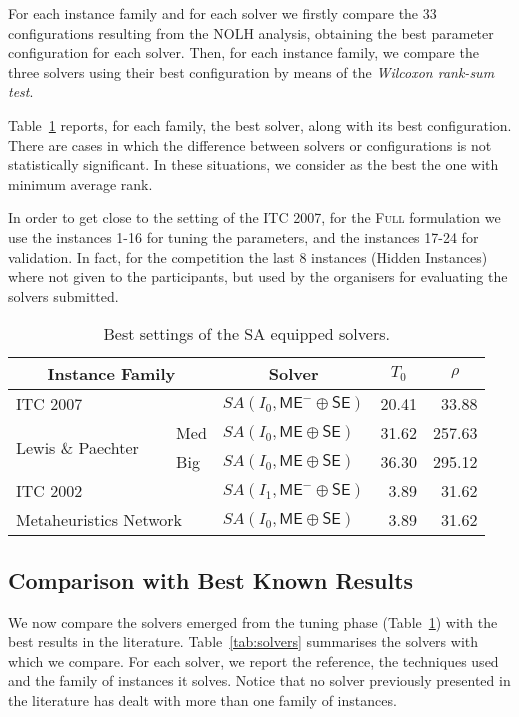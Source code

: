 \documentclass[authoryear,preprint,a4paper,12pt]{elsarticle}
\begin{document}
For each instance family and for each solver we firstly
compare the 33 configurations resulting from the NOLH analysis,
obtaining the best parameter configuration for each solver. Then, for
each instance family, we compare the three solvers using their best
configuration by means of the \emph{Wilcoxon rank-sum test}. 

Table~\ref{tab:comp_solvers} reports, for each family, the best
solver, along with its best configuration. There are cases in which
the difference between solvers or configurations is not statistically
significant. In these situations, we consider as the best the one with
minimum average rank.

In order to get close to the setting of the ITC 2007, for the
\textsc{Full} formulation we use the instances 1-16 for tuning the
parameters, and the instances 17-24 for validation. In fact, for the
competition the last 8 instances (Hidden Instances) where not given to
the participants, but used by the organisers for evaluating the
solvers submitted.

\begin{table}
\centering
\footnotesize
\begin{tabular}{|r@{}l|l|r|r|}\hline
\multicolumn{2}{|c|}{Instance Family} & \multicolumn{1}{c|}{Solver} & \multicolumn{1}{c|}{$T_0$} & \multicolumn{1}{c|}{$\rho$} \\ \hline
\multicolumn{2}{|l|}{ITC 2007} & $SA(I_{0}, \mathsf{ME^-}\oplus\mathsf{SE})$ & 20.41  & 33.88 \\
 \multirow{2}{*}{Lewis \& Paechter}  &~~ Med  & $SA(I_{0}, \mathsf{ME}\oplus\mathsf{SE})$ & 31.62 & 257.63 \\
 						     &~~ Big & $SA(I_{0}, \mathsf{ME}\oplus\mathsf{SE})$ & 36.30 & 295.12 \\
\multicolumn{2}{|l|}{ITC 2002} & $SA(I_{1}, \mathsf{ME^-}\oplus \mathsf{SE})$	 & 3.89 &  31.62  \\
\multicolumn{2}{|l|}{Metaheuristics Network} & $SA(I_{0}, \mathsf{ME}\oplus\mathsf{SE})$  & 3.89 & 31.62  \\
\hline
\end{tabular}
\caption{Best settings of the SA equipped solvers.}
\label{tab:comp_solvers}
\end{table}
\subsection{Comparison with Best Known Results}

We now compare the solvers emerged from the tuning phase
(Table~\ref{tab:comp_solvers}) with the best results in the
literature. Table~\ref{tab:solvers} summarises the solvers with which
we compare. For each solver, we report the reference, the techniques
used and the family of instances it solves. Notice that no solver previously presented in the literature has dealt with more than one family of instances.
\end{document}
